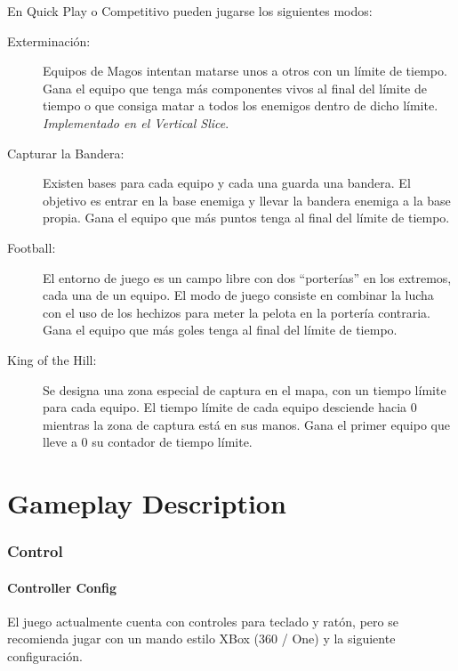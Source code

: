 \documentclass[12pt]{report}
\begin{document}
En Quick Play o Competitivo pueden jugarse los siguientes modos:

\begin{description}
\item[Exterminación:] Equipos de Magos intentan matarse unos a otros con un límite de tiempo. Gana el equipo que tenga más componentes vivos al final del límite de tiempo o que consiga matar a todos los enemigos dentro de dicho límite. \textit{Implementado en el Vertical Slice}.
\item[Capturar la Bandera:] Existen bases para cada equipo y cada una guarda una bandera. El objetivo es entrar en la base enemiga y llevar la bandera enemiga a la base propia. Gana el equipo que más puntos tenga al final del límite de tiempo.
\item[Football:] El entorno de juego es un campo libre con dos ``porterías'' en los extremos, cada una de un equipo. El modo de juego consiste en combinar la lucha con el uso de los hechizos para meter la pelota en la portería contraria. Gana el equipo que más goles tenga al final del límite de tiempo.
\item[King of the Hill:] Se designa una zona especial de captura en el mapa, con un tiempo límite para cada equipo. El tiempo límite de cada equipo desciende hacia 0 mientras la zona de captura está en sus manos. Gana el primer equipo que lleve a 0 su contador de tiempo límite.
\end{description}
\part{Gameplay Description}

\section{Control}

\subsection{Controller Config}

El juego actualmente cuenta con controles para teclado y ratón, pero se recomienda jugar con un mando estilo XBox (360 / One) y la siguiente configuración.
\end{document}
